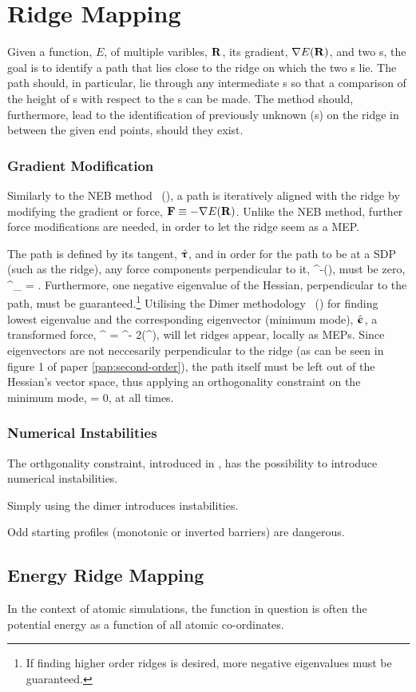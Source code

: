 \section{Ridge Mapping}
\label{sec:ridge-mapping}

Given a function, $E$, of multiple varibles, ${\mathrm{\mathbf{\bm{R}}}}$, its gradient, $\nabla E({\mathrm{\mathbf{\bm{R}}}})$, and two s, the goal is to identify a path that lies close to the ridge on which the two s lie.
The path should, in particular, lie through any intermediate s so that a comparison of the height of s with respect to the s can be made.
The method should, furthermore, lead to the identification of previously unknown (s) on the ridge in between the given end points, should they exist.

\subsubsection{Gradient Modification}
Similarly to the NEB method~\cite{neb-original-1998} (), a path is iteratively aligned with the ridge by modifying the gradient or force, ${\mathrm{\mathbf{\bm{F}}}} \equiv -\nabla E({\mathrm{\mathbf{\bm{R}}}})$.
Unlike the NEB method, further force modifications are needed, in order to let the ridge seem as a MEP.

The path is defined by its tangent, $\hat{{\mathrm{\mathbf{\bm{\uptau}}}}}$, and in order for the path to be at a SDP (such as the ridge), any force components perpendicular to it,
\vF^\perp \equiv \vF -(\vF \cdot \uvt)\uvt,
\eeq
must be zero,
\vF^\perp_ = .
\eeq
Furthermore, one negative eigenvalue of the Hessian, perpendicular to the path, must be guaranteed.\footnote{If finding higher order ridges is desired, more negative eigenvalues must be guaranteed.}
Utilising the Dimer methodology~\cite{dimer-original-1999, dimer-olsen-2004} () for finding lowest eigenvalue and the corresponding eigenvector (minimum mode), $\hat{{\mathrm{\mathbf{\bm{\upepsilon}}}}}$, a transformed force,
\vF^ = \vF^\perp - 2(\vF^\perp \cdot \uvn)\uvn,
\eeq
will let ridges appear, locally as MEPs.
Since eigenvectors are not neccesarily perpendicular to the ridge (as can be seen in figure 1 of paper \ref{pap:second-order}), the path itself must be left out of the Hessian's vector space, thus applying an orthogonality constraint on the minimum mode,
\uvt \cdot \uvn = 0,
\eeq
at all times.

\subsubsection{Numerical Instabilities}
\bit
\item The orthgonality constraint, introduced in , has the possibility to introduce numerical instabilities.
\item Simply using the dimer introduces instabilities.
\item Odd starting profiles (monotonic or inverted barriers) are dangerous.
\eit

\placeholder

\subsection{Energy Ridge Mapping}
\label{sec:energy-ridge-mapping}

In the context of atomic simulations, the function in question is often the potential energy as a function of all atomic co-ordinates.

\incomplete
